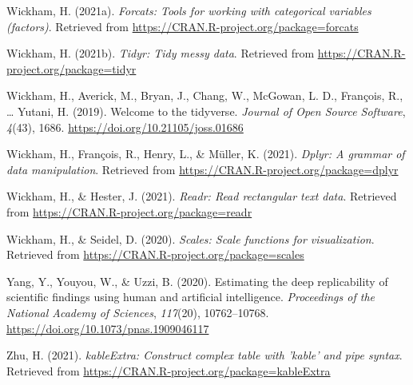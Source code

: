 \documentclass[
  english,
  man,floatsintext]{apa6}
\newlength{\cslhangindent}
\newlength{\cslentryspacingunit} %
\newenvironment{CSLReferences}[2] %
 {%
  \setlength{\parindent}{0pt}
  \ifodd #1
  \let\oldpar\par
  \def\par{\hangindent=\cslhangindent\oldpar}
  \fi
  \setlength{\parskip}{#2\cslentryspacingunit}
 }%
 {}
\begin{document}
\begin{CSLReferences}{1}{0}
\leavevmode{}%
Wickham, H. (2021a). \emph{Forcats: Tools for working with categorical variables (factors)}. Retrieved from \url{https://CRAN.R-project.org/package=forcats}

\leavevmode{}%
Wickham, H. (2021b). \emph{Tidyr: Tidy messy data}. Retrieved from \url{https://CRAN.R-project.org/package=tidyr}

\leavevmode{}%
Wickham, H., Averick, M., Bryan, J., Chang, W., McGowan, L. D., François, R., \ldots{} Yutani, H. (2019). Welcome to the {tidyverse}. \emph{Journal of Open Source Software}, \emph{4}(43), 1686. \url{https://doi.org/10.21105/joss.01686}

\leavevmode{}%
Wickham, H., François, R., Henry, L., \& Müller, K. (2021). \emph{Dplyr: A grammar of data manipulation}. Retrieved from \url{https://CRAN.R-project.org/package=dplyr}

\leavevmode{}%
Wickham, H., \& Hester, J. (2021). \emph{Readr: Read rectangular text data}. Retrieved from \url{https://CRAN.R-project.org/package=readr}

\leavevmode{}%
Wickham, H., \& Seidel, D. (2020). \emph{Scales: Scale functions for visualization}. Retrieved from \url{https://CRAN.R-project.org/package=scales}

\leavevmode{}%
Yang, Y., Youyou, W., \& Uzzi, B. (2020). Estimating the deep replicability of scientific findings using human and artificial intelligence. \emph{Proceedings of the National Academy of Sciences}, \emph{117}(20), 10762--10768. \url{https://doi.org/10.1073/pnas.1909046117}

\leavevmode{}%
Zhu, H. (2021). \emph{kableExtra: Construct complex table with 'kable' and pipe syntax}. Retrieved from \url{https://CRAN.R-project.org/package=kableExtra}

\end{CSLReferences}

\endgroup


\clearpage
\renewcommand{\listfigurename}{Figure captions}
\end{document}
